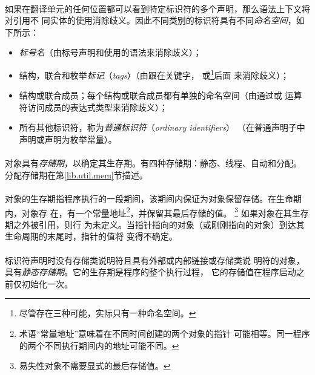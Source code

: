 \paragraph{}
如果在翻译单元的任何位置都可以看到特定标识符的多个声明，那么语法上下文将对引用不
同实体的使用消除歧义。因此不同类别的标识符具有不同\textit{命名空间}，如下所示：
\begin{itemize}
  \item{\textit{标号名}（由标号声明和使用的语法来消除歧义）；}
  \item{结构，联合和枚举\textit{标记}（\textit{tags}）（由跟在关键字，
    或\footnote{尽管存在三种可能，实际只有一种命名空间。}后面
    来消除歧义）；}
  \item{结构或联合成员；每个结构或联合成员都有单独的命名空间（由通过或
    \tm{->}运算符访问成员的表达式类型来消除歧义）；}
  \item{所有其他标识符，称为\textit{普通标识符}（\textit{ordinary identifiers}）
    （在普通声明子中声明或声明为枚举常量）。}
\end{itemize}


\paragraph{}
对象具有\textit{存储期}，以确定其生存期。有四种存储期：静态、线程、自动和分配。
分配存储期在第\ref{lib.util.mem}节描述。

\paragraph{}
对象的生存期指程序执行的一段期间，该期间内保证为对象保留存储。在生命期内，对象存
在，有一个常量地址\footnote{术语``常量地址''意味着在不同时间创建的两个对象的指针
可能相等。同一程序的两个不同执行期间内的地址可能不同。}，并保留其最后存储的值。
\footnote{易失性对象不需要显式的最后存储值。} 如果对象在其生存期之外被引用，则行
为未定义。当指针指向的对象（或刚刚指向的对象）到达其生命周期的末尾时，指针的值将
变得不确定。

\paragraph{}
标识符声明时没有存储类说明符且具有外部或内部链接或存储类说
明符的对象，具有\textit{静态存储期}。它的生存期是程序的整个执行过程，
它的存储值在程序启动之前仅初始化一次。

